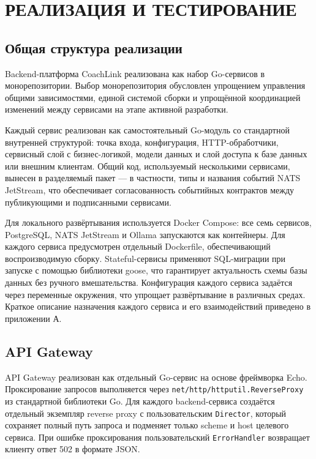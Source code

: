 \section{РЕАЛИЗАЦИЯ И ТЕСТИРОВАНИЕ}

\subsection{Общая структура реализации}

Backend-платформа CoachLink реализована как набор Go-сервисов в монорепозитории. Выбор монорепозитория обусловлен упрощением управления общими зависимостями, единой системой сборки и упрощённой координацией изменений между сервисами на этапе активной разработки.

Каждый сервис реализован как самостоятельный Go-модуль со стандартной внутренней структурой: точка входа, конфигурация, HTTP-обработчики, сервисный слой с бизнес-логикой, модели данных и слой доступа к базе данных или внешним клиентам. Общий код, используемый несколькими сервисами, вынесен в разделяемый пакет --- в частности, типы и названия событий NATS JetStream, что обеспечивает согласованность событийных контрактов между публикующими и подписанными сервисами.

Для локального развёртывания используется Docker Compose: все семь сервисов, PostgreSQL, NATS JetStream и Ollama запускаются как контейнеры. Для каждого сервиса предусмотрен отдельный Dockerfile, обеспечивающий воспроизводимую сборку. Stateful-сервисы применяют SQL-миграции при запуске с помощью библиотеки goose, что гарантирует актуальность схемы базы данных без ручного вмешательства. Конфигурация каждого сервиса задаётся через переменные окружения, что упрощает развёртывание в различных средах. Краткое описание назначения каждого сервиса и его взаимодействий приведено в приложении А.

\subsection{API Gateway}

API Gateway реализован как отдельный Go-сервис на основе фреймворка Echo. Проксирование запросов выполняется через \passthrough{\lstinline!net/http/httputil.ReverseProxy!} из стандартной библиотеки Go. Для каждого backend-сервиса создаётся отдельный экземпляр reverse proxy с пользовательским \passthrough{\lstinline!Director!}, который сохраняет полный путь запроса и подменяет только scheme и host целевого сервиса. При ошибке проксирования пользовательский \passthrough{\lstinline!ErrorHandler!} возвращает клиенту ответ 502 в формате JSON.

